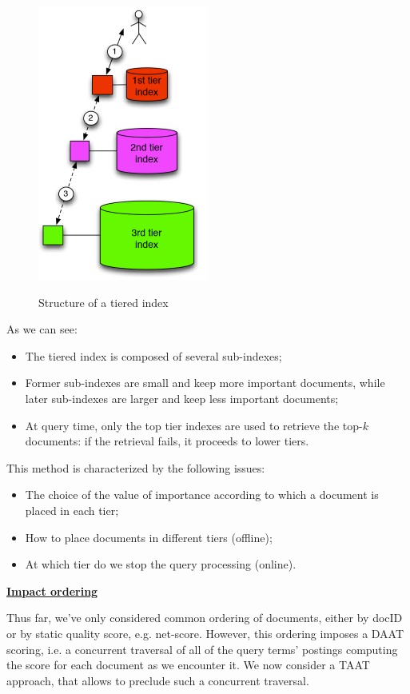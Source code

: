 \begin{figure}[h!]
		\centering
		\includegraphics[scale = 1.5]{img/tiered index 2.jpg}
		\label{tier}
        \caption{Structure of a tiered index}
\end{figure}

As we can see:

\begin{itemize}
    \item The tiered index is composed of several sub-indexes;
    \item Former sub-indexes are small and keep more important documents, while later sub-indexes are larger and keep less important documents;
    \item At query time, only the top tier indexes are used to retrieve the top-$k$ documents: if the retrieval fails, it proceeds to lower tiers.
\end{itemize}

This method is characterized by the following issues:

\begin{itemize}
    \item The choice of the value of importance according to which a document is placed in each tier;
    \item How to place documents in different tiers (offline);
    \item At which tier do we stop the query processing (online).
\end{itemize}

\underline{\textbf{\textbf{Impact ordering}}}

Thus far, we've only considered common ordering of documents, either by docID or by static quality score, e.g. net-score. However, this ordering imposes a DAAT scoring, i.e. a concurrent traversal of all of the query terms' postings computing the score for each document as we encounter it. We now consider a TAAT approach, that allows to preclude such a concurrent traversal.

